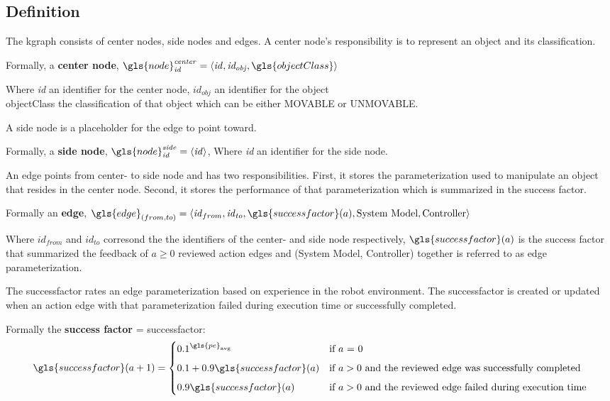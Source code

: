 \subsection{Definition}%
\label{subsec:kgraph_definition}
The \ac{kgraph} consists of center nodes, side nodes and edges. A center node's responsibility is to represent an object and its classification.\bs

Formally, a \textbf{center node}, $\gls{node}^{\mathit{center}}_\mathit{id} =\left\langle \mathit{id}, \mathit{id_{obj}}, \gls{objectClass} \right\rangle $\bs

Where \textit{id} an identifier for the center node, $\mathit{id_{obj}}$ an identifier for the object\\\gls{objectClass} the classification of that object which can be either MOVABLE or UNMOVABLE.\bs

\noindent A side node is a placeholder for the edge to point toward.\bs

Formally, a \textbf{side node}, $\gls{node}^{\mathit{side}}_\mathit{id} =\left\langle \mathit{id} \right\rangle $, Where \textit{id} an identifier for the side node.\bs

\noindent An edge points from center- to side node and has two responsibilities. First, it stores the parameterization used to manipulate an object that resides in the center node. Second, it stores the performance of that parameterization which is summarized in the success factor.\bs

Formally an \textbf{edge}, $\gls{edge}_{(from, to)} = \left\langle \mathit{id}_{from}, \mathit{id}_{to}, \gls{successfactor}(a), \textrm{System Model}, \textrm{Controller}\right\rangle$\bs

Where $\mathit{id}_\mathit{from}$ and $\mathit{id}_\mathit{to}$ corresond the the identifiers of the center- and side node respectively, $\gls{successfactor}(a)$ is the success factor that summarized the feedback of $a\geq0$ reviewed action edges and (System Model, Controller) together is referred to as edge parameterization. \bs

The successfactor rates an edge parameterization based on experience in the robot environment. The successfactor is created or updated when an action edge with that parameterization failed during execution time or successfully completed.\bs

Formally the \textbf{success factor} = \gls{successfactor}:
\[\gls{successfactor}(a+1) =
  \begin{cases} 0.1^{\gls{pe}_\textrm{avg}}& \textrm{if $a$ = 0}\\[5px]
    0.1 + 0.9\gls{successfactor}(a) & \textrm{if $a > 0$ and the reviewed edge was successfully completed}\\[5px]
  0.9\gls{successfactor}(a) & \textrm{if $a > 0$ and the reviewed edge failed during execution time}
\end{cases}\]

